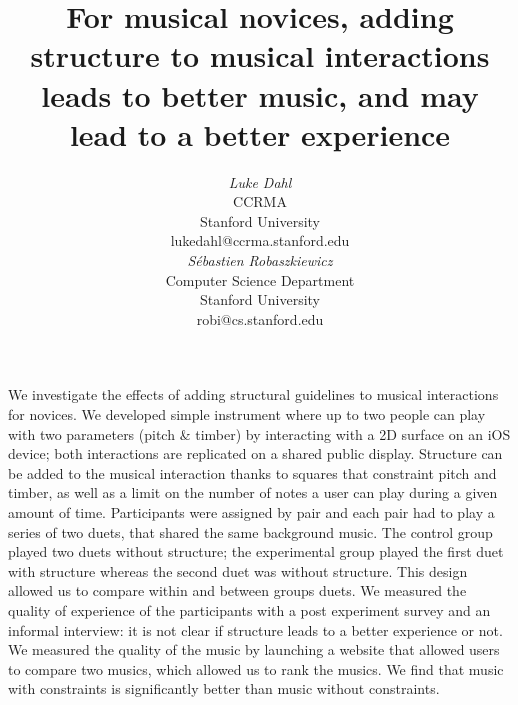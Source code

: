 \documentclass{article}
\begin{document}




\title{For musical novices, adding structure to musical interactions leads to better music, and may lead to a better experience}


\author{
\parbox[t]{9cm}{\centering
	     {\em Luke Dahl}\\
	     CCRMA\\
	     Stanford University\\
	     lukedahl@ccrma.stanford.edu}
\parbox[t]{9cm}{\centering
	     {\em S\'ebastien Robaszkiewicz}\\
	     Computer Science Department\\
	     Stanford University\\
	     robi@cs.stanford.edu}
}

\maketitle

\abstract
We investigate the effects of adding structural guidelines to musical interactions for novices. We developed simple instrument where up to two people can play with two parameters (pitch \& timber) by interacting with a 2D surface on an iOS device; both interactions are replicated on a shared public display. Structure can be added to the musical interaction thanks to squares that constraint pitch and timber, as well as a limit on the number of notes a user can play during a given amount of time. Participants were assigned by pair and each pair had to play a series of two duets, that shared the same background music. The control group played two duets without structure; the experimental group played the first duet with structure whereas the second duet was without structure. This design allowed us to compare within and between groups duets. We measured the quality of experience of the participants with a post experiment survey and an informal interview: it is not clear if structure leads to a better experience or not. We measured the quality of the music by launching a website that allowed users to compare two musics, which allowed us to rank the musics. We find that music with constraints is significantly better than music without constraints.
\end{document}
